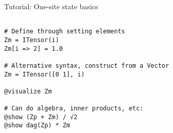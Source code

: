 \begin{frame}[fragile]{Tutorial: One-site state basics}

\begin{lstlisting}

# Define through setting elements
Zm = ITensor(i)
Zm[i => 2] = 1.0

# Alternative syntax, construct from a Vector
Zm = ITensor([0 1], i)

@visualize Zm

# Can do algebra, inner products, etc:
@show (Zp + Zm) / √2
@show dag(Zp) * Zm

\end{lstlisting}

\end{frame}
